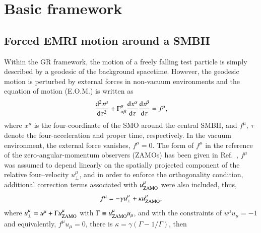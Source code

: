 \documentclass[aps,prx,reprint,superscriptaddress,nofootinbib,longbibliography]{revtex4-1}
\begin{document}
\section{Basic framework}
\label{sec:basic framework}
\subsection{Forced EMRI motion around a SMBH}\label{sec:forced motion}
Within the GR framework, the motion of a freely falling test particle is simply described by a geodesic of the background spacetime. 
However,  the geodesic motion is perturbed by external forces in non-vacuum environments and the equation of motion (E.O.M.) is written as 
\begin{equation}
    \dv[2]{x^{\mu}}{\tau}+\Gamma^{\mu}_{\alpha\beta}\dv{x^{\alpha}}{\tau}\dv{x^{\beta}}{\tau}=f^{\mu},
    \label{eq: forced geodesic}
\end{equation}
where $x^{\mu}$ is the four-coordinate of the SMO around the central SMBH, and $f^{\mu},\ \tau$ denote the four-acceleration and proper time, respectively. In the vacuum environment, the external force vanishes,  $f^{\mu}=0$. 
The form of $f^{\mu}$ in the reference of the zero-angular-momentum observers (ZAMOs) has been given in Ref.~\cite{PhysRevD.83.044037}, $f^{\mu}$ was assumed to depend linearly on the spatially projected component of the relative four–velocity $u_{\perp}^{\mu}$, and in order to enforce the orthogonality condition, additional correction terms associated with $u_{\rm ZAMO}^{\mu}$ were also included, thus,
\begin{equation}
    f^{\mu}=-\gamma u^{\mu}_{\perp}+\kappa u^{\mu}_{\rm ZAMO},
\end{equation}
where $u^{\mu}_{\perp}=u^{\mu}+\Gamma u^{\mu}_{\rm ZAMO}$ with $\Gamma\equiv u^{\mu}_{\rm ZAMO}u_{\mu}$, and with the constraints of $u^{\mu}u_{\mu}=-1$ and equivalently, $f^{\mu}u_{\mu}=0$, there is $\kappa=\gamma(\Gamma-1/\Gamma)$, then
\end{document}
